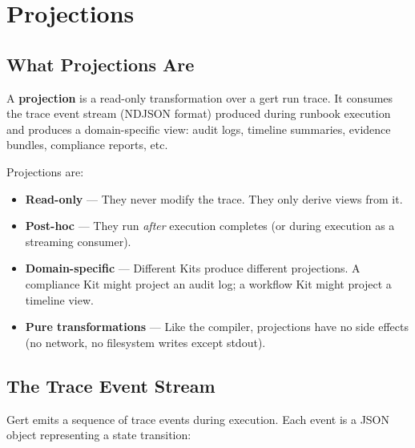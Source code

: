 
\chapter{Projections}
\label{ch:projections}

\section{What Projections Are}
\label{sec:what-projections}

A \textbf{projection} is a read-only transformation over a gert run trace. It
consumes the trace event stream (NDJSON format) produced during runbook
execution and produces a domain-specific view: audit logs, timeline summaries,
evidence bundles, compliance reports, etc.

Projections are:

\begin{itemize}
  \item \textbf{Read-only} --- They never modify the trace. They only derive
    views from it.
  \item \textbf{Post-hoc} --- They run \emph{after} execution completes (or
    during execution as a streaming consumer).
  \item \textbf{Domain-specific} --- Different Kits produce different
    projections. A compliance Kit might project an audit log; a workflow Kit
    might project a timeline view.
  \item \textbf{Pure transformations} --- Like the compiler, projections have no
    side effects (no network, no filesystem writes except stdout).
\end{itemize}

\section{The Trace Event Stream}
\label{sec:trace-events}

Gert emits a sequence of trace events during execution. Each event is a JSON
object representing a state transition:

